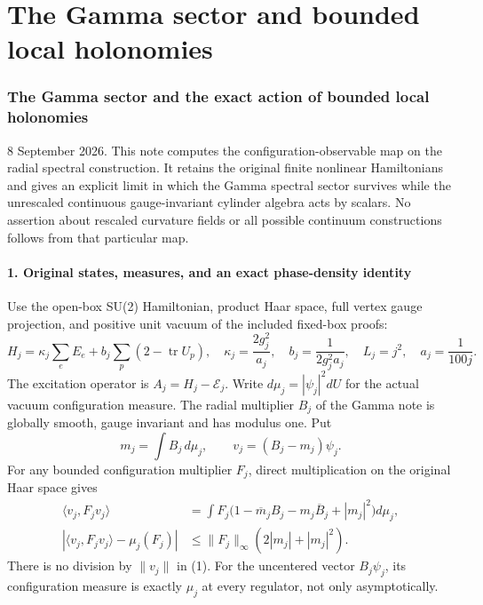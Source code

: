 \documentclass[
  11pt,
]{article}
\begin{document}
\clearpage
\part{The Gamma sector and bounded local holonomies}
\section{The Gamma sector and the exact action of bounded local
holonomies}\label{weak-coupling-part-6-the-gamma-sector-and-the-exact-action-of-bounded-local-holonomies}

8 September 2026. This note computes the configuration-observable map on
the radial spectral construction. It retains the original finite
nonlinear Hamiltonians and gives an explicit limit in which the Gamma
spectral sector survives while the unrescaled continuous gauge-invariant
cylinder algebra acts by scalars. No assertion about rescaled curvature
fields or all possible continuum constructions follows from that
particular map.

\subsection{1. Original states, measures, and an exact phase-density
identity}\label{weak-coupling-part-6-original-states-measures-and-an-exact-phase-density-identity}

Use the open-box SU(2) Hamiltonian, product Haar space, full vertex
gauge projection, and positive unit vacuum of the included fixed-box
proofs: \[
 H_j=\kappa_j\sum_eE_e+b_j\sum_p(2-\operatorname{tr}U_p),
 \quad \kappa_j=\frac{2g_j^2}{a_j},\quad
 b_j=\frac1{2g_j^2a_j},\quad L_j=j^2,\quad a_j=\frac1{100j}.
\] The excitation operator is \(A_j=H_j-\mathcal E_j\). Write
\(d\mu_j=|\psi_j|^2dU\) for the actual vacuum configuration measure. The
radial multiplier \(B_j\) of the Gamma note is globally smooth, gauge
invariant and has modulus one. Put \[
 m_j=\int B_j\,d\mu_j,\qquad
 v_j=(B_j-m_j)\psi_j .
\] For any bounded configuration multiplier \(F_j\), direct
multiplication on the original Haar space gives \[
 \begin{split}
 \langle v_j,F_jv_j\rangle
 &=\int F_j\bigl(1-\overline m_j B_j-m_j\overline B_j+|m_j|^2\bigr)d\mu_j,\\
 \left|\langle v_j,F_jv_j\rangle-\mu_j(F_j)\right|
 &\le\|F_j\|_\infty(2|m_j|+|m_j|^2).
 \tag{1}
 \end{split}
\] There is no division by \(\|v_j\|\) in (1). For the uncentered vector
\(B_j\psi_j\), its configuration measure is exactly \(\mu_j\) at every
regulator, not only asymptotically.
\end{document}
